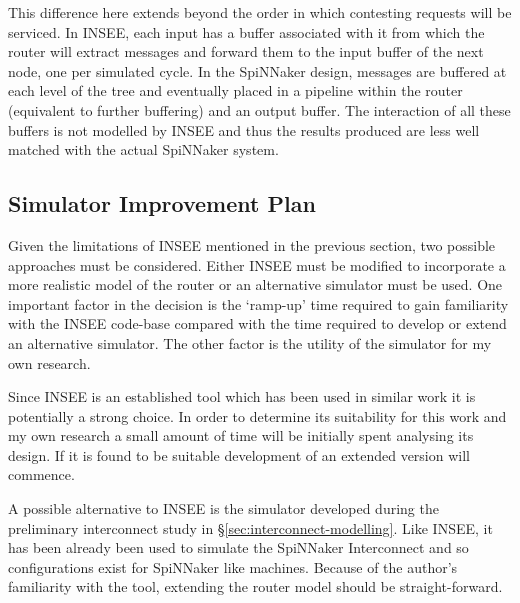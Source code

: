 			This difference here extends beyond the order in which contesting requests
			will be serviced. In INSEE, each input has a buffer associated with it
			from which the router will extract messages and forward them to the input
			buffer of the next node, one per simulated cycle. In the SpiNNaker design,
			messages are buffered at each level of the tree and eventually placed in a
			pipeline within the router (equivalent to further buffering) and an output
			buffer. The interaction of all these buffers is not modelled by INSEE and
			thus the results produced are less well matched with the actual SpiNNaker
			system.
			
		
		\subsection{Simulator Improvement Plan}
			
			\label{sec:simulator-improvement-plan}
			
			Given the limitations of INSEE mentioned in the previous section, two
			possible approaches must be considered. Either INSEE must be modified to
			incorporate a more realistic model of the router or an alternative
			simulator must be used.  One important factor in the decision is the
			`ramp-up' time required to gain familiarity with the INSEE code-base
			compared with the time required to develop or extend an alternative
			simulator. The other factor is the utility of the simulator for my own
			research.
			
			Since INSEE is an established tool which has been used in similar work it
			is potentially a strong choice. In order to determine its suitability for
			this work and my own research a small amount of time will be initially
			spent analysing its design. If it is found to be suitable development of
			an extended version will commence.
			
			A possible alternative to INSEE is the simulator developed during the
			preliminary interconnect study in \S\ref{sec:interconnect-modelling}.
			Like INSEE, it has been already been used to simulate the SpiNNaker
			Interconnect and so configurations exist for SpiNNaker like machines.
			Because of the author's familiarity with the tool, extending the router
			model should be straight-forward.
	
